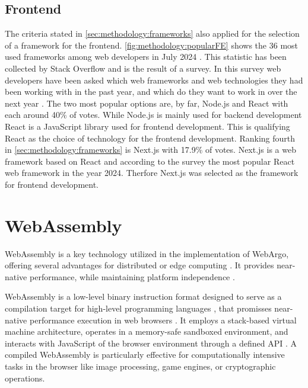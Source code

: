 \subsection{Frontend}
\label{subsec:methodology:frameworks:frontend}
The criteria stated in \autoref{sec:methodology:frameworks} also applied for the selection of a framework for the frontend. \autoref{fig:methodology:popularFE} shows the 36 most used frameworks among web developers in July 2024 \cite{frontend:popularity}. This statistic has been collected by Stack Overflow and is the result of a survey. In this survey web developers have been asked which web frameworks and web technologies they had been working with in the past year, and which do they want to work in over the next year \cite{frontend:popularity}. The two most popular options are, by far, Node.js and React with each around 40\% of votes. While Node.js is mainly used for backend development React is a JavaScript library used for frontend development. This is qualifying React as the choice of technology for the frontend development. Ranking fourth in \autoref{sec:methodology:frameworks} is Next.js with 17.9\% of votes. Next.js is a web framework based on React \cite{methodology:nextjs} and according to the survey the most popular React web framework in the year 2024. Therfore Next.js was selected as the framework for frontend development.

\section{WebAssembly}
\label{sec:methodology:wasm}
WebAssembly \cite{methodology:wasmW3C} is a key technology utilized in the implementation of WebArgo, offering several advantages for distributed or edge computing \cite{relatedwork:wasmedgecomputing}. It provides near-native performance, while maintaining platform independence \cite{methodology:wasm, methodology:wasmW3C, relatedwork:wasmedgecomputing}. 

WebAssembly is a low-level binary instruction format designed to serve as a compilation target for high-level programming languages \cite{methodology:wasm, methodology:wasmW3C, methodology:wasm2}, that promisses near-native performance execution in web browsers \cite{methodology:wasm, methodology:wasmW3C, relatedwork:wasmedgecomputing}. It employs a stack-based virtual machine architecture, operates in a memory-safe sandboxed environment, and interacts with JavaScript of the browser environment through a defined \ac{API} \cite{methodology:wasm, methodology:wasmW3C, methodology:wasm2, methodology:wasmdocu}. A compiled WebAssembly is particularly effective for computationally intensive tasks in the browser \cite{methodology:wasm2, methodology:wasmW3C} like image processing, game engines, or cryptographic operations.

